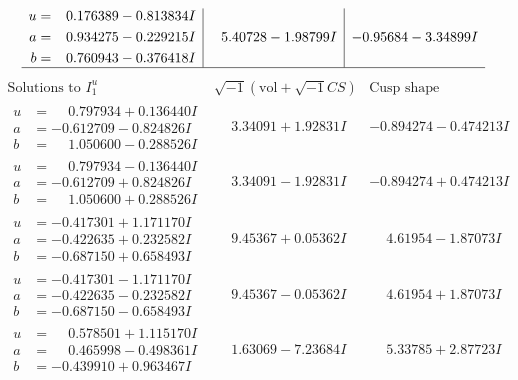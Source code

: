 \documentclass[1p]{elsarticle_modified}
\theoremstyle{definition}
\newcommand{\I}{\sqrt{-1}}
\begin{document}
$$\begin{array}{c|c|c}
\begin{aligned}
u &= \phantom{-}0.176389 - 0.813834 I \\
a &= \phantom{-}0.934275 - 0.229215 I \\
b &= \phantom{-}0.760943 - 0.376418 I\end{aligned}
 & \phantom{-}5.40728 - 1.98799 I & -0.95684 - 3.34899 I\\
 \hline 
 \end{array}$$\newpage$$\begin{array}{c|c|c}  
\text{Solutions to }I^u_{1}& \I (\text{vol} + \sqrt{-1}CS) & \text{Cusp shape}\\
 \hline 
\begin{aligned}
u &= \phantom{-}0.797934 + 0.136440 I \\
a &= -0.612709 - 0.824826 I \\
b &= \phantom{-}1.050600 - 0.288526 I\end{aligned}
 & \phantom{-}3.34091 + 1.92831 I & -0.894274 - 0.474213 I \\ \hline\begin{aligned}
u &= \phantom{-}0.797934 - 0.136440 I \\
a &= -0.612709 + 0.824826 I \\
b &= \phantom{-}1.050600 + 0.288526 I\end{aligned}
 & \phantom{-}3.34091 - 1.92831 I & -0.894274 + 0.474213 I \\ \hline\begin{aligned}
u &= -0.417301 + 1.171170 I \\
a &= -0.422635 + 0.232582 I \\
b &= -0.687150 + 0.658493 I\end{aligned}
 & \phantom{-}9.45367 + 0.05362 I & \phantom{-}4.61954 - 1.87073 I \\ \hline\begin{aligned}
u &= -0.417301 - 1.171170 I \\
a &= -0.422635 - 0.232582 I \\
b &= -0.687150 - 0.658493 I\end{aligned}
 & \phantom{-}9.45367 - 0.05362 I & \phantom{-}4.61954 + 1.87073 I \\ \hline\begin{aligned}
u &= \phantom{-}0.578501 + 1.115170 I \\
a &= \phantom{-}0.465998 - 0.498361 I \\
b &= -0.439910 + 0.963467 I\end{aligned}
 & \phantom{-}1.63069 - 7.23684 I & \phantom{-}5.33785 + 2.87723 I \\ \hline\begin{aligned}

\end{aligned}
\end{array}$$
\end{document}
